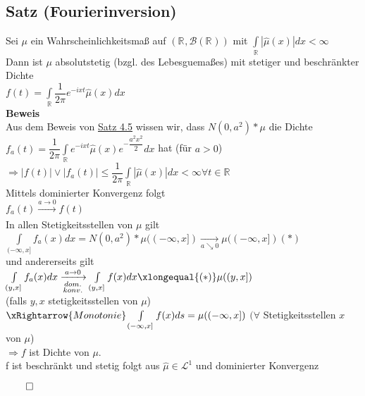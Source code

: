 \documentclass[german,10pt,oneside, fleqn, a4paper]{article}
\newcommand {\R}	{\mathbb{R}}
\newcommand{\Ra}	{\Rightarrow}
\newcommand{\ra}{\rightarrow}
\newcommand{\brc}[1]{\left(#1\right)}
\newcommand{\QED}{\begin{flushright}$\qed$\end{flushright}}
\newcommand{\mc}[1]{\mathcal{#1}}
\newcommand{\lp}[1]{\mc{L}^{#1}}
\newcommand{\beweis}{\textbf{Beweis}\\}
\newcommand{\1}[1]{1_{#1}}
\newcommand{\2}[1]{\1{\brac{#1}}}
\newcommand{\xr}[2][]{\xrightarrow[#1]{#2}}
\newcommand{\rbor}[1][d]{\brc{\R^{#1},\mc{B}\brc{\R^{#1}}}}
\newcommand{\intr}{\int\limits_\R}
\begin{document}
\subsection{Satz (Fourierinversion)}
\label{4.12}
Sei $\mu$ ein Wahrscheinlichkeitsmaß auf $\rbor[]$ mit $\intr|\widehat{\mu}(x)|dx<\infty$\\
Dann ist $\mu$ absolutstetig (bzgl. des Lebesguemaßes) mit stetiger und beschränkter Dichte\\
$f(t)=\intr\dfrac{1}{2\pi}e^{-ixt}\widehat{\mu}(x)dx$\\
\beweis
Aus dem Beweis von \hyperref[4.5]{Satz 4.5} wissen wir, dass $N(0,a^2)*\mu$ die Dichte\\
$f_a(t)=\dfrac{1}{2\pi}\intr e^{-ixt}\widehat{\mu}(x)e^{-\dfrac{a^2x^2}{2}}dx$ hat (für $a>0$)\\
$\Ra |f(t)|\vee|f_a(t)|\leq\dfrac{1}{2\pi}\intr|\widehat{\mu}(x)|dx<\infty\forall t\in\R$\\
Mittels dominierter Konvergenz folgt\\
$f_a(t)\xr{a\ra0}f(t)$\\
In allen Stetigkeitsstellen von $\mu$ gilt \\
$\int\limits_{(-\infty,x]}f_a(x)dx=N(0,a^2)*\mu((-\infty,x])\xr[a\searrow0]{}\mu((-\infty,x])   (*)$\\
und andererseits gilt \\
$\int\limits_{(y,x]}f_a(x)dx\xr[\substack{dom.\\konv.}]{a\ra0}\int\limits_{(y,x]}f(x)dx\xlongequal{(*)}\mu((y,x])$\\
(falls $y,x$ stetigkeitsstellen von $\mu$)\\
$\xRightarrow{Monotonie}\int\limits_{(-\infty,x]}f(x)ds=\mu((-\infty,x])$ $(\forall$ Stetigkeitsstellen $x$ von $\mu$)\\
$\Ra f$ ist Dichte von $\mu$.\\
f ist beschränkt und stetig folgt aus $\widehat{\mu}\in\lp{1}$ und dominierter Konvergenz\QED
\end{document}
